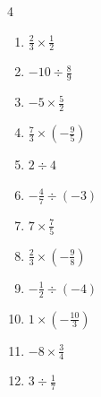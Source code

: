 \begin{multicols}{4}
\begin{enumerate}
        \phantom{$\displaystyle =-1$}

  \item $\displaystyle \frac{2}{3}\times{}\frac{1}{2}$


  \item $\displaystyle -10\div{}\frac{8}{9}$


  \item $\displaystyle -5\times{}\frac{5}{2}$


  \item $\displaystyle \frac{7}{3}\times{}\left(-\frac{9}{5}\right)$


\columnbreak %

  \item $\displaystyle 2\div{}4$


  \item $\displaystyle -\frac{4}{7}\div{}\left(-3\right)$


  \item $\displaystyle 7\times{}\frac{7}{5}$


  \item $\displaystyle \frac{2}{3}\times{}\left(-\frac{9}{8}\right)$


  \item $\displaystyle -\frac{1}{2}\div{}\left(-4\right)$


  \item $\displaystyle 1\times{}\left(-\frac{10}{3}\right)$


  \item $\displaystyle -8\times{}\frac{3}{4}$

        \phantom{$\displaystyle =-6$}

  \item $\displaystyle 3\div{}\frac{1}{7}$


\end{enumerate}
\end{multicols}
